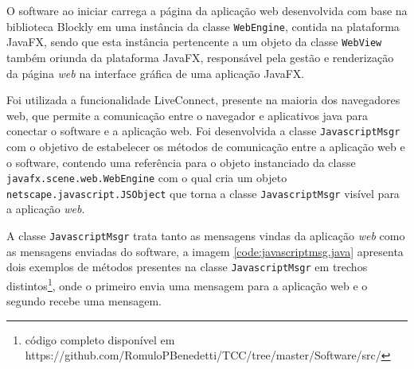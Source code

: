 \documentclass[tg]{mdtufsm}
\begin{document}
                    O software ao iniciar carrega a página da aplicação web desenvolvida com base na biblioteca Blockly em uma instância da classe \texttt{WebEngine}, contida na plataforma JavaFX, sendo que esta instância pertencente a um objeto da classe \texttt{WebView} também oriunda da plataforma JavaFX, responsável pela gestão e renderização da página \emph{web} na interface gráfica de uma aplicação JavaFX.

                    Foi utilizada a funcionalidade LiveConnect, presente na maioria dos navegadores web, que permite a comunicação entre o navegador e aplicativos java para conectar o software e a aplicação web. Foi desenvolvida a classe \texttt{JavascriptMsgr} com o objetivo de estabelecer os métodos de comunicação entre a aplicação web e o software, contendo uma referência para o objeto instanciado da classe \texttt{javafx.scene.web.WebEngine} com o qual cria um objeto \texttt{netscape.javascript.JSObject} que torna a classe \texttt{JavascriptMsgr} visível para a aplicação \emph{web}.

                    A classe \texttt{JavascriptMsgr} trata tanto as mensagens vindas da aplicação \emph{web} como as mensagens enviadas do software, a imagem \ref{code:javascriptmsg.java} apresenta dois exemplos de métodos presentes na classe \texttt{JavascriptMsgr} em trechos distintos\footnote{código completo disponível em https://github.com/RomuloPBenedetti/TCC/tree/master/Software/src/}, onde o primeiro envia uma mensagem para a aplicação web e o segundo recebe uma mensagem.
\end{document}
